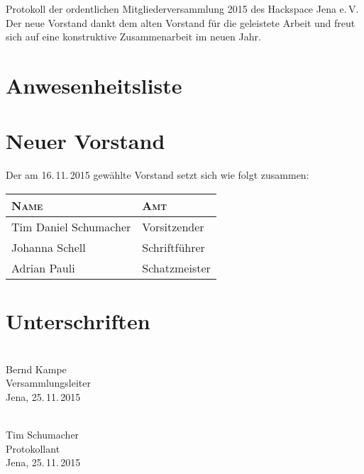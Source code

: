 \documentclass[ngerman]{scrartcl}
\begin{document}
\begin{Protokoll}{Protokoll der ordentlichen Mitgliederversammlung 2015 des Hackspace Jena e.\,V.}
Der neue Vorstand dankt dem alten Vorstand für die geleistete Arbeit und freut
sich auf eine konstruktive Zusammenarbeit im neuen Jahr.

\newpage
\appendix

\section{Anwesenheitsliste}
\newpage
\section{Neuer Vorstand}

Der am 16.\,11.\,2015 gewählte Vorstand setzt sich wie folgt zusammen:

\label{sec:neuer_vorstand}
\begin{table}[h!]
    \centering
    \begin{tabularx}{\textwidth}{l|l}
        \textsc{Name} & \textsc{Amt} \\ \hline
        Tim Daniel Schumacher & Vorsitzender \\
        Johanna Schell &  Schriftführer \\
        Adrian Pauli & Schatzmeister
    \end{tabularx}
\end{table}

\newpage
\section{Unterschriften}
\vspace{2cm}
\begin{multicols}{2}
  \noindent \makebox[5cm]{\hrulefill} \\
  Bernd Kampe \\
  Versammlungsleiter \\
  Jena, 25.\,11.\,2015

  \noindent \makebox[5cm]{\hrulefill} \\
  Tim Schumacher \\
  Protokollant \\
  Jena, 25.\,11.\,2015
\end{multicols}

\end{Protokoll}
\end{document}
